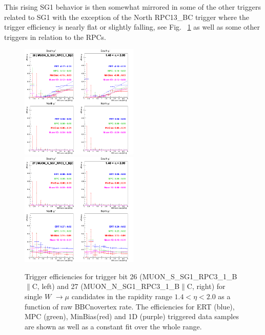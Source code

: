 \clearpage
This rising SG1 behavior is then somewhat mirrored in some of the other triggers
related to SG1 with the exception of the North RPC13\_BC trigger where the
trigger efficiency is nearly flat or slightly falling, see Fig.~
\ref{fig:run13_trigeffirate_trig2627} as well as some other triggers in relation
to the RPCs.
\begin{figure}[h!]

  \centering

  \includegraphics[width=0.5\textwidth]{./figures/run13_trigeffirate_eta1_trig26_lin.png}
  \includegraphics[width=0.5\textwidth]{./figures/run13_trigeffirate_eta1_trig27_lin.png}
  \caption{\label{fig:run13_trigeffirate_trig2627} Trigger efficiencies for trigger bit 26 (MUON\_S\_SG1\_RPC3\_1\_B$\|$C, left) and 27 (MUON\_N\_SG1\_RPC3\_1\_B$\|$C, right) for single $W$ $\rightarrow \mu$ candidates in the rapidity range $ 1.4 < \eta < 2.0$ as a function of raw BBCnovertex rate. The efficiencies for ERT (blue), MPC (green), MinBias(red) and 1D (purple) triggered data samples are shown as well as a constant fit over the whole range.}

\end{figure}
\clearpage

